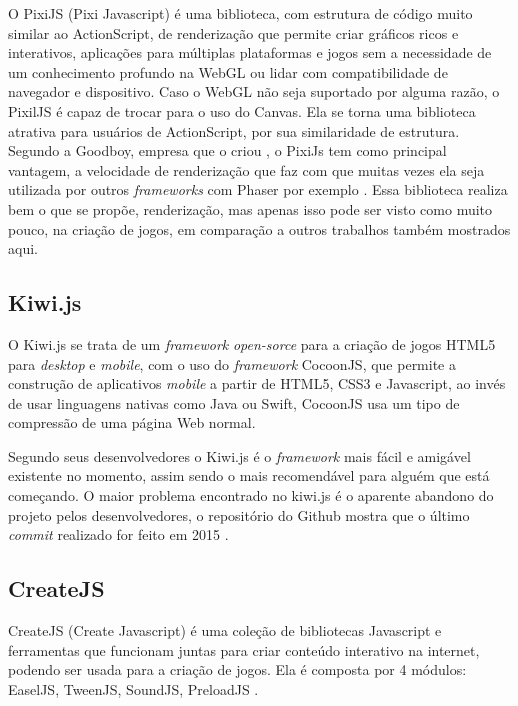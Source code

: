 O PixiJS (Pixi Javascript) é uma biblioteca, com estrutura de código muito similar ao ActionScript, de renderização que permite criar gráficos ricos e interativos, aplicações para múltiplas plataformas  e jogos sem a necessidade de um conhecimento profundo na WebGL ou lidar com compatibilidade de navegador e dispositivo. Caso o WebGL não seja suportado por alguma razão, o PixilJS é capaz de trocar para o uso do Canvas. Ela se torna uma biblioteca atrativa para usuários de ActionScript, por sua similaridade de estrutura. Segundo a Goodboy, empresa que o criou \cite{van2015learn}, o PixiJs tem como principal vantagem, a velocidade de renderização que faz com que muitas vezes ela seja utilizada por outros \textit{frameworks} com Phaser por exemplo \cite{van2015learn}.
Essa biblioteca realiza bem o que se propõe, renderização, mas apenas isso pode ser visto como muito pouco, na criação de jogos, em comparação a outros trabalhos também mostrados aqui.



\subsection{ Kiwi.js }


O Kiwi.js se trata de um  \textit{framework} 
\textit{open-sorce} para a criação de jogos HTML5
para \textit{desktop} e \textit{mobile}, com o
uso do  \textit{framework}  CocoonJS, que permite a construção de aplicativos \textit{mobile} a partir
de HTML5, CSS3 e Javascript, ao invés de usar
linguagens nativas como Java ou Swift, CocoonJS
usa um tipo de compressão de uma página Web
normal. 

Segundo seus desenvolvedores o Kiwi.js é
o  \textit{framework}  mais fácil e amigável
existente no momento, assim sendo o mais
recomendável para alguém que está começando. O maior problema encontrado no kiwi.js é o aparente abandono do projeto pelos desenvolvedores, o repositório do Github mostra que o último \textit{commit} realizado for feito em 2015 \cite{kiwiGit}.

\subsection{ CreateJS }

CreateJS (Create Javascript) é uma coleção de bibliotecas Javascript e ferramentas que funcionam juntas para criar conteúdo interativo na internet, podendo ser usada para a criação de jogos. Ela é composta por 4 módulos: EaselJS, TweenJS, SoundJS, PreloadJS \cite{manderscheid2014beginning}.

